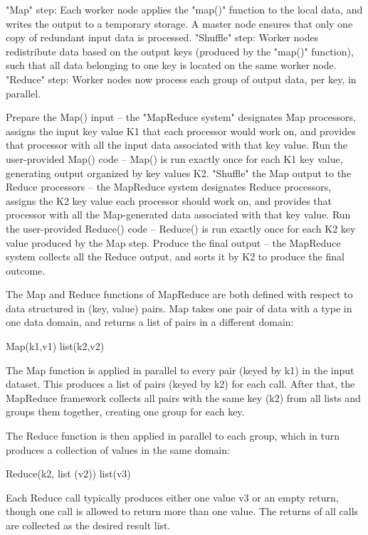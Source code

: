\documentclass[conference]{IEEEtran}
\begin{document}
"Map" step: Each worker node applies the "map()" function to the local data, and writes the output to a temporary storage. A master node ensures that only one copy of redundant input data is processed.
"Shuffle" step: Worker nodes redistribute data based on the output keys (produced by the "map()" function), such that all data belonging to one key is located on the same worker node.
"Reduce" step: Worker nodes now process each group of output data, per key, in parallel.



Prepare the Map() input – the "MapReduce system" designates Map processors, assigns the input key value K1 that each processor would work on, and provides that processor with all the input data associated with that key value.
Run the user-provided Map() code – Map() is run exactly once for each K1 key value, generating output organized by key values K2.
"Shuffle" the Map output to the Reduce processors – the MapReduce system designates Reduce processors, assigns the K2 key value each processor should work on, and provides that processor with all the Map-generated data associated with that key value.
Run the user-provided Reduce() code – Reduce() is run exactly once for each K2 key value produced by the Map step.
Produce the final output – the MapReduce system collects all the Reduce output, and sorts it by K2 to produce the final outcome.



The Map and Reduce functions of MapReduce are both defined with respect to data structured in (key, value) pairs. Map takes one pair of data with a type in one data domain, and returns a list of pairs in a different domain:

Map(k1,v1)  list(k2,v2)

The Map function is applied in parallel to every pair (keyed by k1) in the input dataset. This produces a list of pairs (keyed by k2) for each call. After that, the MapReduce framework collects all pairs with the same key (k2) from all lists and groups them together, creating one group for each key.

The Reduce function is then applied in parallel to each group, which in turn produces a collection of values in the same domain:

Reduce(k2, list (v2))  list(v3)

Each Reduce call typically produces either one value v3 or an empty return, though one call is allowed to return more than one value. The returns of all calls are collected as the desired result list.
\end{document}
